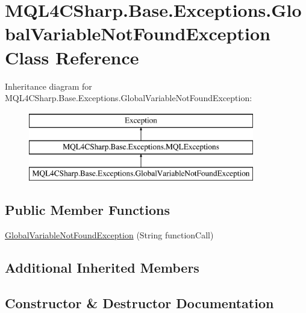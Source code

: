 \hypertarget{class_m_q_l4_c_sharp_1_1_base_1_1_exceptions_1_1_global_variable_not_found_exception}{}\section{M\+Q\+L4\+C\+Sharp.\+Base.\+Exceptions.\+Global\+Variable\+Not\+Found\+Exception Class Reference}
\label{class_m_q_l4_c_sharp_1_1_base_1_1_exceptions_1_1_global_variable_not_found_exception}
Inheritance diagram for M\+Q\+L4\+C\+Sharp.\+Base.\+Exceptions.\+Global\+Variable\+Not\+Found\+Exception\+:\begin{figure}[H]
\begin{center}
\leavevmode
\includegraphics[height=3.000000cm]{class_m_q_l4_c_sharp_1_1_base_1_1_exceptions_1_1_global_variable_not_found_exception}
\end{center}
\end{figure}
\subsection*{Public Member Functions}
\begin{DoxyCompactItemize}
\item 
\hyperlink{class_m_q_l4_c_sharp_1_1_base_1_1_exceptions_1_1_global_variable_not_found_exception_afa4e0d46475a7d84f17e8c8f0d4ecafe}{Global\+Variable\+Not\+Found\+Exception} (String function\+Call)
\end{DoxyCompactItemize}
\subsection*{Additional Inherited Members}


\subsection{Constructor \& Destructor Documentation}
